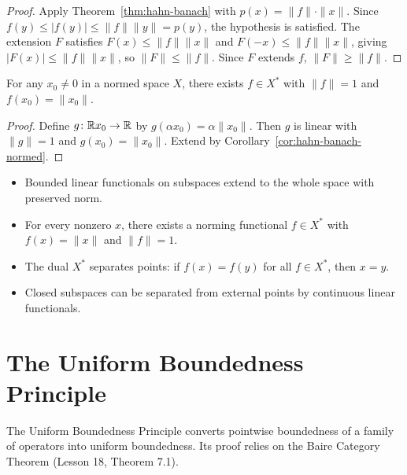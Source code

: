 \documentclass[11pt,a4paper]{article}
\begin{document}
\begin{proof}
Apply Theorem~\ref{thm:hahn-banach} with $p(x) = \|f\| \cdot \|x\|$.
Since $f(y) \leq |f(y)| \leq \|f\| \|y\| = p(y)$, the hypothesis is
satisfied. The extension $F$ satisfies $F(x) \leq \|f\| \|x\|$ and
$F(-x) \leq \|f\| \|x\|$, giving $|F(x)| \leq \|f\| \|x\|$, so
$\|F\| \leq \|f\|$. Since $F$ extends $f$, $\|F\| \geq \|f\|$.
\end{proof}

\begin{corollary}
\label{cor:norming}
For any $x_0 \neq 0$ in a normed space $X$, there exists $f \in X^*$
with $\|f\| = 1$ and $f(x_0) = \|x_0\|$.
\end{corollary}

\begin{proof}
Define $g \colon \mathbb{R} x_0 \to \mathbb{R}$ by $g(\alpha x_0) = \alpha \|x_0\|$.
Then $g$ is linear with $\|g\| = 1$ and $g(x_0) = \|x_0\|$. Extend by
Corollary~\ref{cor:hahn-banach-normed}.
\end{proof}

\begin{keyresult}[title={Hahn--Banach Theorem -- Summary of Consequences}]
\begin{itemize}[nosep]
    \item Bounded linear functionals on subspaces extend to the whole
          space with preserved norm.
    \item For every nonzero $x$, there exists a norming functional
          $f \in X^*$ with $f(x) = \|x\|$ and $\|f\| = 1$.
    \item The dual $X^*$ separates points: if $f(x) = f(y)$ for all
          $f \in X^*$, then $x = y$.
    \item Closed subspaces can be separated from external points by
          continuous linear functionals.
\end{itemize}
\end{keyresult}


\section{The Uniform Boundedness Principle}
\label{sec:ubp}

The Uniform Boundedness Principle converts pointwise boundedness of a
family of operators into uniform boundedness. Its proof relies on the
Baire Category Theorem (Lesson 18, Theorem 7.1).
\end{document}
